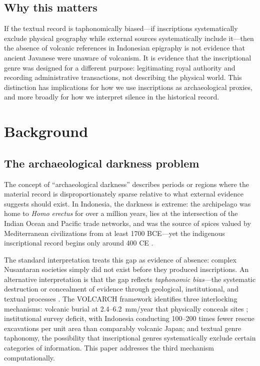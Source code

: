 \documentclass[12pt]{article}
\begin{document}
\subsection{Why this matters}

If the textual record is taphonomically biased---if inscriptions systematically exclude physical geography while external sources systematically include it---then the absence of volcanic references in Indonesian epigraphy is not evidence that ancient Javanese were unaware of volcanism.
It is evidence that the inscriptional genre was designed for a different purpose: legitimating royal authority and recording administrative transactions, not describing the physical world.
This distinction has implications for how we use inscriptions as archaeological proxies, and more broadly for how we interpret silence in the historical record.



\section{Background}

\subsection{The archaeological darkness problem}

The concept of ``archaeological darkness'' describes periods or regions where the material record is disproportionately sparse relative to what external evidence suggests should exist.
In Indonesia, the darkness is extreme: the archipelago was home to \textit{Homo erectus} for over a million years, lies at the intersection of the Indian Ocean and Pacific trade networks, and was the source of spices valued by Mediterranean civilizations from at least 1700 BCE---yet the indigenous inscriptional record begins only around 400 CE \citep{Coedes1968, Vogel1918}.

The standard interpretation treats this gap as evidence of absence: complex Nusantaran societies simply did not exist before they produced inscriptions.
An alternative interpretation is that the gap reflects \emph{taphonomic bias}---the systematic destruction or concealment of evidence through geological, institutional, and textual processes \citep{Schiffer1987}.
The VOLCARCH framework \citep[submitted]{Amien2026a} identifies three interlocking mechanisms: volcanic burial at 2.4--6.2~mm/year that physically conceals sites \citep{Lavigne2000}; institutional survey deficit, with Indonesia conducting 100--200 times fewer rescue excavations per unit area than comparably volcanic Japan; and textual genre taphonomy, the possibility that inscriptional genres systematically exclude certain categories of information.
This paper addresses the third mechanism computationally.
\end{document}
